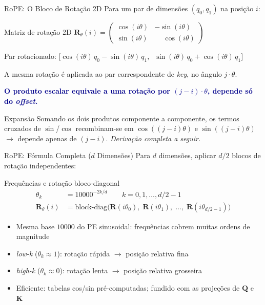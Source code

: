 \documentclass[aspectratio=169, xcolor=dvipsnames]{beamer}
\begin{document}
  \begin{frame}{RoPE: O Bloco de Rotação 2D}
    Para um par de dimensões $(q_0, q_1)$ na posição $i$:

    \begin{block}{Matriz de rotação 2D}
      $\mathbf{R}_\theta(i) = \begin{pmatrix} \cos(i\theta) & -\sin(i\theta) \\ \sin(i\theta) & \phantom{-}\cos(i\theta) \end{pmatrix}$

      \vspace{0.3em}
      Par rotacionado: $\bigl[\cos(i\theta)\,q_0 - \sin(i\theta)\,q_1,\;\; \sin(i\theta)\,q_0 + \cos(i\theta)\,q_1\bigr]$
    \end{block}

    A mesma rotação é aplicada ao par correspondente de \textit{key}, no ângulo $j \cdot \theta$.

    \vspace{0.3em}
    \textcolor{DarkBlue}{\textbf{O produto escalar equivale a uma rotação por $(j{-}i) \cdot \theta$, depende só do \textit{offset}.}}

    \begin{exampleblock}{Expansão}
      Somando os dois produtos componente a componente, os termos cruzados de $\sin$/$\cos$ recombinam-se em $\cos((j{-}i)\theta)$ e $\sin((j{-}i)\theta)$ $\to$ depende apenas de $(j-i)$. \textit{Derivação completa a seguir.}
    \end{exampleblock}
  \end{frame}

  \begin{frame}{RoPE: Fórmula Completa ($d$ Dimensões)}
    Para $d$ dimensões, aplicar $d/2$ blocos de rotação independentes:

    \begin{block}{Frequências e rotação bloco-diagonal}
      \vspace{-0.5em}
      \begin{align*}
        \theta_k &= 10000^{-2k/d} \qquad k = 0, 1, \ldots, d/2{-}1 \\[4pt]
        \mathbf{R}_\theta(i) &= \text{block-diag}\!\bigl(\mathbf{R}(i\theta_0),\; \mathbf{R}(i\theta_1),\; \ldots,\; \mathbf{R}(i\theta_{d/2-1})\bigr)
      \end{align*}
    \end{block}

    \begin{itemize}
      \item Mesma base $10000$ do PE sinusoidal: frequências cobrem muitas ordens de magnitude
      \item \textit{low-k} ($\theta_k \approx 1$): rotação rápida $\to$ posição relativa fina
      \item \textit{high-k} ($\theta_k \approx 0$): rotação lenta $\to$ posição relativa grosseira
      \item Eficiente: tabelas cos/sin pré-computadas; fundido com as projeções de $\mathbf{Q}$ e $\mathbf{K}$
    \end{itemize}
  \end{frame}
\end{document}

